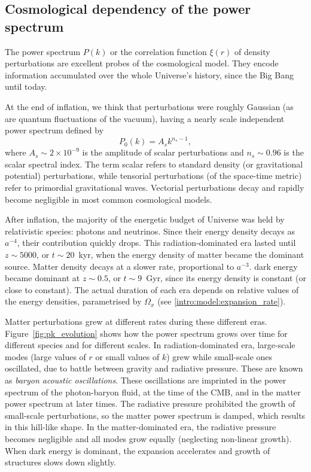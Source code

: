     \subsection{Cosmological dependency of the power spectrum}
    \label{intro:lss:cosmology_dependency}

    The power spectrum $P(k)$ or the correlation function $\xi(r)$ of density 
    perturbations are excellent probes of the cosmological model. 
    They encode information accumulated over the whole Universe's history, 
    since the Big Bang until today.

    At the end of inflation, we think that perturbations were roughly Gaussian 
    (as are quantum fluctuations of the vacuum), 
    having a nearly scale independent power spectrum defined by
    \begin{equation}
        P_0(k) = A_s k^{n_s-1},
        \label{eq:initial_power_spectrum}
    \end{equation}
    where $A_s \sim 2 \times 10^{-9}$ is the amplitude of scalar perturbations 
    and $n_s \sim 0.96$ is the scalar spectral index. The term scalar refers to 
    standard density (or gravitational potential) perturbations, 
    while tensorial perturbations (of the space-time metric) refer to 
    primordial gravitational waves. Vectorial perturbations decay and rapidly become
    negligible in most common cosmological models. 

    After inflation, the majority of the energetic budget of Universe was held
    by relativistic species: photons and neutrinos. Since their energy density decays as $a^{-4}$, 
    their contribution quickly drops. This radiation-dominated era lasted until 
    $z \sim 5000$, or $t \sim 20$~kyr, when the energy density of matter became 
    the dominant source. Matter density decays at a slower rate, proportional to $a^{-3}$.
    dark energy became dominant at $z \sim 0.5$, or $t \sim 9$~Gyr, since its 
    energy density is constant (or close to constant).  
    The actual duration of each era depends on relative values of 
    the energy densities, parametrised by $\Omega_x$ 
    (see \ref{intro:model:expansion_rate}). 

    Matter perturbations grew at different rates during these different eras.
    Figure~\ref{fig:pk_evolution} shows how the power spectrum grows over time 
    for different species and for different scales. 
    In radiation-dominated era, large-scale modes (large values of $r$ 
    or small values of $k$) grew while small-scale ones oscillated,
    due to battle between gravity and radiative pressure. 
    These are known as \emph{baryon acoustic oscillations}. These oscillations
    are imprinted in the power spectrum of the photon-baryon fluid, at the time of the CMB, 
    and in the matter power spectrum at later times. 
    The radiative pressure prohibited the growth of small-scale perturbations,
    so the matter power spectrum is damped, which results in this hill-like shape. 
    In the matter-dominated era, the radiative pressure becomes negligible 
    and all modes grow equally (neglecting non-linear growth). 
    When dark energy is dominant, the expansion accelerates and 
    growth of structures slows down slightly. 
    
